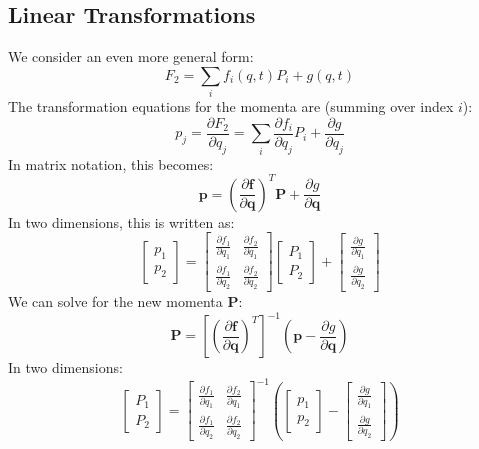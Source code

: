 \documentclass[12pt]{article}
\begin{document}
	\subsection{Linear Transformations}
	We consider an even more general form:
	$$
	F_2 = \sum_i f_i(q, t) P_i + g(q, t)
	$$
	The transformation equations for the momenta are (summing over index $i$):
	$$
	p_j = \frac{\partial F_2}{\partial q_j} = \sum_i \frac{\partial f_i}{\partial q_j} P_i + \frac{\partial g}{\partial q_j}
	$$
	In matrix notation, this becomes:
	$$
	\mathbf{p} = \left(\frac{\partial \mathbf{f}}{\partial \mathbf{q}}\right)^T \mathbf{P} + \frac{\partial g}{\partial \mathbf{q}}
	$$
	In two dimensions, this is written as:
	$$
	\begin{bmatrix} p_1 \\ p_2 \end{bmatrix}
	=
	\begin{bmatrix}
		\frac{\partial f_1}{\partial q_1} & \frac{\partial f_2}{\partial q_1} \\
		\frac{\partial f_1}{\partial q_2} & \frac{\partial f_2}{\partial q_2}
	\end{bmatrix}
	\begin{bmatrix} P_1 \\ P_2 \end{bmatrix}
	+
	\begin{bmatrix} \frac{\partial g}{\partial q_1} \\ \frac{\partial g}{\partial q_2} \end{bmatrix}
	$$
	We can solve for the new momenta $\mathbf{P}$:
	$$
	\mathbf{P} = \left[ \left(\frac{\partial \mathbf{f}}{\partial \mathbf{q}}\right)^T \right]^{-1} \left( \mathbf{p} - \frac{\partial g}{\partial \mathbf{q}} \right)
	$$
	In two dimensions:
	$$
	\begin{bmatrix} P_1 \\ P_2 \end{bmatrix}
	=
	\begin{bmatrix}
		\frac{\partial f_1}{\partial q_1} & \frac{\partial f_2}{\partial q_1} \\
		\frac{\partial f_1}{\partial q_2} & \frac{\partial f_2}{\partial q_2}
	\end{bmatrix}^{-1}
	\left(
	\begin{bmatrix} p_1 \\ p_2 \end{bmatrix}
	-
	\begin{bmatrix} \frac{\partial g}{\partial q_1} \\ \frac{\partial g}{\partial q_2} \end{bmatrix}
	\right)
	$$
\end{document}
